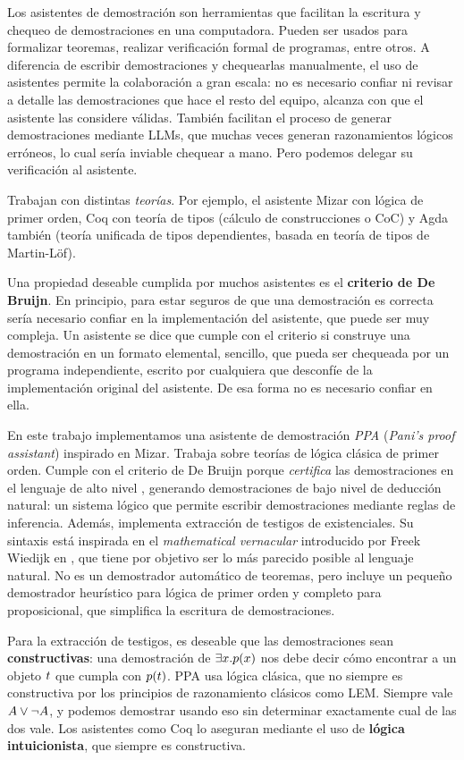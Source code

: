 Los asistentes de demostración son herramientas que facilitan la escritura y chequeo de demostraciones en una computadora. Pueden ser usados para formalizar teoremas, realizar verificación formal de programas, entre otros. A diferencia de escribir demostraciones y chequearlas manualmente, el uso de asistentes permite la colaboración a gran escala: no es necesario confiar ni revisar a detalle las demostraciones que hace el resto del equipo, alcanza con que el asistente las considere válidas. También facilitan el proceso de generar demostraciones mediante LLMs, que muchas veces generan razonamientos lógicos erróneos, lo cual sería inviable chequear a mano. Pero podemos delegar su verificación al asistente.

Trabajan con distintas \textit{teorías}. Por ejemplo, el asistente Mizar con lógica de primer orden, Coq con teoría de tipos (cálculo de construcciones o CoC) y Agda también (teoría unificada de tipos dependientes, basada en teoría de tipos de Martin-Löf).

Una propiedad deseable cumplida por muchos asistentes es el \textbf{criterio de De Bruijn}. En principio, para estar seguros de que una demostración es correcta sería necesario confiar en la implementación del asistente, que puede ser muy compleja. Un asistente se dice que cumple con el criterio si construye una demostración en un formato elemental, sencillo, que pueda ser chequeada por un programa independiente, escrito por cualquiera que desconfíe de la implementación original del asistente. De esa forma no es necesario confiar en ella.

En este trabajo implementamos una asistente de demostración \textit{PPA}
(\textit{Pani's proof assistant}) inspirado en Mizar. Trabaja sobre teorías de
lógica clásica de primer orden. Cumple con el criterio de De Bruijn porque
\textit{certifica} las demostraciones en el lenguaje de alto nivel \ppaLang{},
generando demostraciones de bajo nivel de deducción natural: un sistema lógico
que permite escribir demostraciones mediante reglas de inferencia. Además,
implementa extracción de testigos de existenciales. Su sintaxis está inspirada
en el \textit{mathematical vernacular} introducido por Freek Wiedijk en
\cite{freek-mv}, que tiene por objetivo ser lo más parecido posible al lenguaje
natural. No es un demostrador automático de teoremas, pero incluye un pequeño
demostrador heurístico para lógica de primer orden y completo para
proposicional, que simplifica la escritura de demostraciones.

Para la extracción de testigos, es deseable que las demostraciones sean
\textbf{constructivas}: una demostración de $\exists x . p(x)$ nos
debe decir cómo encontrar a un objeto $t$ que cumpla con $p(t)$. PPA
usa lógica clásica, que no siempre es constructiva por los principios de
razonamiento clásicos como LEM. Siempre vale $A \vee \neg
A$, y podemos demostrar usando eso sin determinar exactamente cual de las
dos vale. Los asistentes como Coq lo aseguran mediante el uso de \textbf{lógica
intuicionista}, que siempre es constructiva.

